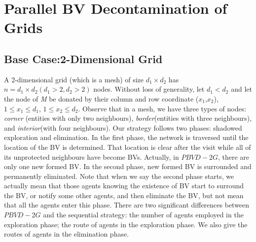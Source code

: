 \section{Parallel BV Decontamination of Grids}
\subsection{Base Case:2-Dimensional Grid}
A 2-dimensional grid (which is a mesh) of size $d_1\times d_2$ has $n=d_1\times d_2(d_1>2,d_2>2)$ nodes. Without loss of generality, let $d_1<d_2$ and let the node of {\em M} be donated by their column and row coordinate ($x_1$,$x_2$), $1\leq x_1 \leq d_1$, $1\leq x_2 \leq d_2$. Observe that in a mesh, we have three types of nodes: \textit{corner} (entities with only two neighbours), \textit{border}(entities with three neighbours), and \textit{interior}(with four neighbours).  Our strategy follows two phases: shadowed exploration and elimination. In the first phase, the network is traversed until the location of the BV is determined. That location is clear after the visit while all of its unprotected neighbours have become BVs. Actually, in $PBVD-2G$, there are only one new formed BV. In the second phase, new formed BV is surrounded and permanently eliminated. Note that when we say the second phase starts, we actually mean that those agents knowing the existence of BV start to surround the BV, or notify some other agents, and then eliminate the BV, but not mean that all the agents enter this phase. There are two significant differences between $PBVD-2G$ and the sequential strategy: the number of agents employed in the exploration phase; the route of agents in the exploration phase. We also give the routes of agents in the elimination phase. 

 \\

